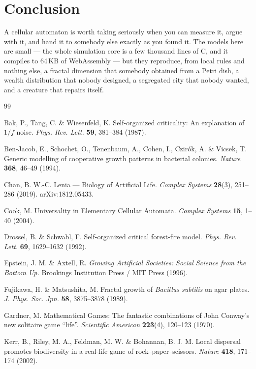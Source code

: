 \documentclass[11pt,a4paper]{article}
\begin{document}
\section{Conclusion}

A cellular automaton is worth taking seriously when you can measure it, argue with
it, and hand it to somebody else exactly as you found it. The models here are
small --- the whole simulation core is a few thousand lines of C, and it compiles
to 64\,KB of WebAssembly --- but they reproduce, from local rules and nothing
else, a fractal dimension that somebody obtained from a Petri dish, a wealth
distribution that nobody designed, a segregated city that nobody wanted, and a
creature that repairs itself.

\begin{thebibliography}{99}\small

 Bak, P., Tang, C. \& Wiesenfeld, K.
  Self-organized criticality: An explanation of $1/f$ noise.
  \emph{Phys. Rev. Lett.} \textbf{59}, 381--384 (1987).

 Ben-Jacob, E., Schochet, O., Tenenbaum, A., Cohen, I.,
  Czir\'{o}k, A. \& Vicsek, T.
  Generic modelling of cooperative growth patterns in bacterial colonies.
  \emph{Nature} \textbf{368}, 46--49 (1994).

 Chan, B. W.-C.
  Lenia --- Biology of Artificial Life.
  \emph{Complex Systems} \textbf{28}(3), 251--286 (2019). arXiv:1812.05433.

 Cook, M.
  Universality in Elementary Cellular Automata.
  \emph{Complex Systems} \textbf{15}, 1--40 (2004).

 Drossel, B. \& Schwabl, F.
  Self-organized critical forest-fire model.
  \emph{Phys. Rev. Lett.} \textbf{69}, 1629--1632 (1992).

 Epstein, J. M. \& Axtell, R.
  \emph{Growing Artificial Societies: Social Science from the Bottom Up.}
  Brookings Institution Press / MIT Press (1996).

 Fujikawa, H. \& Matsushita, M.
  Fractal growth of \emph{Bacillus subtilis} on agar plates.
  \emph{J. Phys. Soc. Jpn.} \textbf{58}, 3875--3878 (1989).

 Gardner, M.
  Mathematical Games: The fantastic combinations of John Conway's new solitaire
  game ``life''. \emph{Scientific American} \textbf{223}(4), 120--123 (1970).

 Kerr, B., Riley, M. A., Feldman, M. W. \& Bohannan, B. J. M.
  Local dispersal promotes biodiversity in a real-life game of
  rock--paper--scissors. \emph{Nature} \textbf{418}, 171--174 (2002).


\end{thebibliography}
\end{document}
